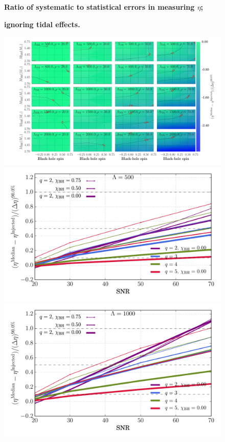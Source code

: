 \documentclass[aps,prd,amsmath,floats,floatfix, twocolumn,
superscriptaddress,nofootinbib,showpacs]{revtex4-1}
\begin{document}
%
\begin{figure}[!t]
\centering
\textbf{Ratio of systematic to statistical errors in measuring $\eta$;}\par
\textbf{ignoring tidal effects.}\par\medskip
\includegraphics[width=2\columnwidth]{plots/TNEtaBiasesOverCIWidths_CI90_0_Lambda_SNR20_70_linear}
\includegraphics[width=0.8\columnwidth]{plots/TNEtaBiasesOverCIWidthsVsSNR_Lambda500_CI90_0}
\includegraphics[width=0.8\columnwidth]{plots/TNEtaBiasesOverCIWidthsVsSNR_Lambda1000_CI90_0}\\

\end{figure}
\end{document}
